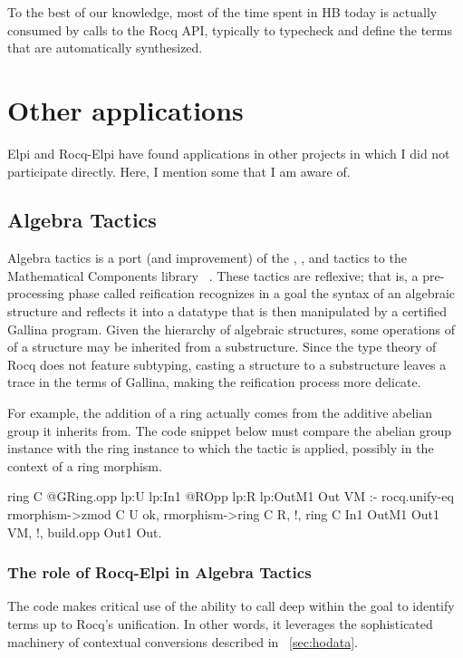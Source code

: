 \documentclass[a4paper, 11pt]{book}
\begin{document}
To the best of our knowledge, most of the time spent in HB today is actually
consumed by calls to the Rocq API, typically to typecheck and define the terms
that are automatically synthesized.

\section{Other applications}


Elpi and Rocq-Elpi have found applications in other projects in which I did not
participate directly. Here, I mention some that I am aware of.

\subsection{Algebra Tactics}

Algebra tactics is a port (and improvement) of the , ,
and  tactics to the Mathematical Components library
~\cite{sakaguchi:LIPIcs.ITP.2022.29}. These tactics are reflexive; that is, a
pre-processing phase called reification recognizes in a goal the syntax of an
algebraic structure and reflects it into a datatype that is then manipulated by
a certified Gallina program. Given the hierarchy of algebraic structures, some operations
of of a structure may be inherited from a substructure. Since the type
theory of Rocq does not feature subtyping, casting a structure to a
substructure leaves a trace in the terms of Gallina, making the reification
process more delicate.

For example, the addition of a ring actually comes from the additive abelian
group it inherits from. The code snippet below must compare the abelian group
instance  with the ring instance  to which the tactic is
applied, possibly in the context  of a ring morphism.

\begin{elpicode}
ring C {{ @GRing.opp lp:U lp:In1 }} {{ @ROpp lp:R lp:OutM1 }} Out VM :-
  rocq.unify-eq { rmorphism->zmod C } U ok,
  rmorphism->ring C R, !,
  ring C In1 OutM1 Out1 VM, !,
  build.opp Out1 Out.  
\end{elpicode}

\subsubsection{The role of Rocq-Elpi in Algebra Tactics}


The code makes critical use of the ability to call  deep
within the goal to identify terms up to Rocq's unification. In other words, it
leverages the sophisticated machinery of contextual conversions described in
~\cref{sec:hodata}.
\end{document}
